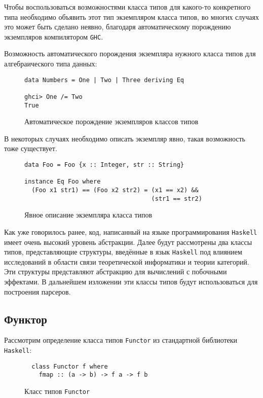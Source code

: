Чтобы воспользоваться возможностями класса типов для какого-то конкретного типа 
необходимо объявить этот тип экземпляром класса типов, во многих случаях это 
может быть сделано неявно, благодаря автоматическому порождению экземпляров 
компилятором \lstinline{GHC}.

Возможность автоматического порождения экземпляра нужного класса типов для 
алгебраического типа данных:
\begin{figure}[h]
\begin{lstlisting}
data Numbers = One | Two | Three deriving Eq

ghci> One /= Two
True
\end{lstlisting}
\caption{Автоматическое порождение экземпляров классов типов}
\label{listing:List}
\end{figure}


В некоторых случаях необходимо описать экземпляр явно, такая возможность тоже 
существует.

\begin{figure}[h]
\begin{lstlisting}
data Foo = Foo {x :: Integer, str :: String}

instance Eq Foo where
  (Foo x1 str1) == (Foo x2 str2) = (x1 == x2) &&
                                   (str1 == str2)
\end{lstlisting}
\caption{Явное описание экземпляра класса типов}
\label{listing:Instance}
\end{figure}

Как уже говорилось ранее, код, написанный на языке программирования 
\lstinline{Haskell} имеет очень высокий уровень абстракции. Далее будут 
рассмотрены два классы типов, представляющие структуры, введённые в язык 
\lstinline{Haskell} под влиянием исследований в области связи теоретической 
информатики и теории категорий. Эти структуры представляют абстракцию для 
вычислений с побочными эффектами. В дальнейшем изложении эти классы типов будут
использоваться для построения парсеров.

\subsection{Функтор}

Рассмотрим определение класса типов \lstinline{Functor} из стандартной 
библиотеки \lstinline{Haskell}:

\begin{figure}[h]
\begin{lstlisting}
  class Functor f where
    fmap :: (a -> b) -> f a -> f b
\end{lstlisting}
\caption{Класс типов \lstinline{Functor}}
\label{listing:Functor}
\end{figure}


